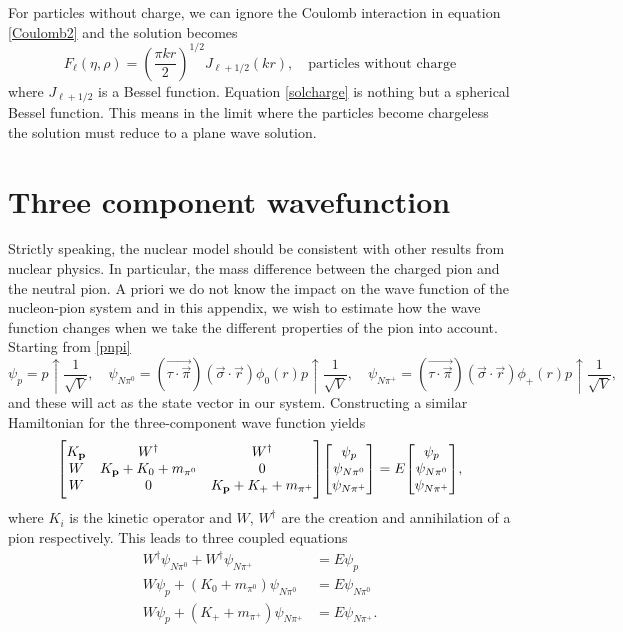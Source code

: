 For particles without charge, we can ignore the Coulomb interaction in equation \eqref{Coulomb2} and the solution becomes
\begin{equation} \label{solcharge}
	F_\ell(\eta,\rho) = \left( \frac{\pi kr}{2} \right)^{1/2} J_{\ell+1/2}(kr), \quad \text{particles without charge}
\end{equation}
where $J_{\ell+1/2}$ is a Bessel function. Equation \eqref{solcharge} is nothing but a spherical Bessel function. This means in the limit where the particles become chargeless the solution must reduce to a plane wave solution. 

\chapter{Three component wavefunction}\label{ThreeComponentWavefunction}
Strictly speaking, the nuclear model should be consistent with other results from nuclear physics. In particular, the mass difference between the charged pion and the neutral pion. A priori we do not know the impact on the wave function of the nucleon-pion system and in this appendix, we wish to estimate how the wave function changes when we take the different properties of the pion into account. Starting from \eqref{pnpi}
\begin{equation}\label{pnpipi}
	\psi_p = p\uparrow\frac{1}{\sqrt{V}}, \quad \psi_{N\pi^0}=(\vec{\tau\cdot\vec{\pi}})(\vec{\sigma}\cdot\vec{r})\phi_0(r) p\uparrow\frac{1}{\sqrt{V}}, \quad \psi_{N\pi^+}=(\vec{\tau\cdot\vec{\pi}})(\vec{\sigma}\cdot\vec{r})\phi_+(r) p\uparrow\frac{1}{\sqrt{V}},
\end{equation}
and these will act as the state vector in our system. Constructing a similar Hamiltonian for the three-component wave function yields
\begin{equation}
	\mqty[K_{\vec{p}} & W^\dagger & W^\dagger \\ W & K_{\vec{p}}+K_0+m_{\pi^0} & 0 \\ W & 0 & K_{\vec{p}}+K_{+}+m_{\pi^+}]\mqty[\psi_p \\ \psi_{N\pi^0} \\ \psi_{N\pi^+}] = E \mqty[\psi_p \\ \psi_{N\pi^0} \\ \psi_{N\pi^+}],
\end{equation}
where $K_i$ is the kinetic operator and $W$, $W^\dagger$ are the creation and annihilation of a pion respectively. This leads to three coupled equations 
\begin{align}
	W^\dagger \psi_{N\pi^0}+W^\dagger \psi_{N\pi^+} & = E\psi_p \\    
	W\psi_p + (K_0+m_{\pi^0})\psi_{N\pi^0} &=E\psi_{N\pi^0} \\
	W\psi_p + (K_{+}+m_{\pi^+})\psi_{N\pi^+}  & =E\psi_{N\pi^+}. 
\end{align}
